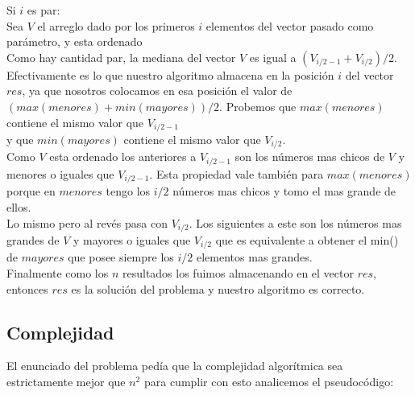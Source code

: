 \documentclass[a4paper, 10pt]{article}
\begin{document}
\noindent Si $i$ es par:\\

Sea $V$ el arreglo dado por los primeros $i$ elementos del vector pasado como parámetro, y esta ordenado\\
Como hay cantidad par, la mediana del vector $V$ es igual a $(V_{i/2 -1} + V_{i/2}) /2$.
Efectivamente es lo que nuestro algoritmo almacena en la posición $i$ del vector $res$, ya que nosotros colocamos en esa posición el valor de $(max(menores) + min(mayores)) /2$.
Probemos que $max(menores)$ contiene el mismo valor que $V_{i/2 -1}$\\
y que $min(mayores)$ contiene el mismo valor que $V_{i/2}$.\\
Como $V$ esta ordenado los anteriores a $V_{i/2 -1}$ son los números mas chicos de $V$ y menores o iguales que $V_{i/2 -1}$.
Esta propiedad vale también para $max(menores)$ porque en $menores$ tengo los $i/2$ números mas chicos y tomo el mas grande
de ellos.\\
Lo mismo pero al revés pasa con $V_{i/2}$. Los siguientes a este son los números mas grandes de $V$ y mayores o iguales que $V_{i/2}$ que es equivalente a obtener el min() de $mayores$ que posee siempre los $i/2$ elementos mas grandes.\\

\noindent Finalmente como los $n$ resultados los fuimos almacenando en el vector $res$, entonces $res$ es la solución del problema y nuestro algoritmo es correcto.

\subsection{Complejidad}

El enunciado del problema pedía que la complejidad algorítmica sea estrictamente mejor que $n^2$
para cumplir con esto analicemos el pseudocódigo:\\
\end{document}
